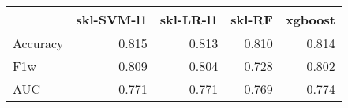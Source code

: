 \begin{tabular}{lrrrr}
\toprule
{} &  skl-SVM-l1 &  skl-LR-l1 &  skl-RF &  xgboost \\
\midrule
Accuracy &       0.815 &      0.813 &   0.810 &    0.814 \\
F1w      &       0.809 &      0.804 &   0.728 &    0.802 \\
AUC      &       0.771 &      0.771 &   0.769 &    0.774 \\
\bottomrule
\end{tabular}
